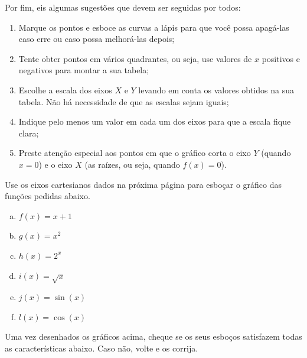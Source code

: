 \documentclass[main_estudante.tex]{subfiles}
\begin{document}
Por fim, eis algumas sugestões que devem ser seguidas por todos:

\begin{enumerate}
 \item Marque os pontos e esboce as curvas a lápis para que você possa apagá-las caso erre ou caso possa melhorá-las depois;
 \item Tente obter pontos em vários quadrantes, ou seja, use valores de $x$ positivos e negativos para montar a sua tabela;
 \item Escolhe a escala dos eixos $X$ e $Y$ levando em conta os valores obtidos na sua tabela. Não há necessidade de que as escalas sejam iguais;
 \item Indique pelo menos um valor em cada um dos eixos para que a escala fique clara;
 \item Preste atenção especial aos pontos em que o gráfico corta o eixo $Y$ (quando $x=0$) e o eixo $X$ (as raízes, ou seja, quando $f(x)=0$).
\end{enumerate}

\newpage

\begin{questao}
Use os eixos cartesianos dados na próxima página para  esboçar o gráfico das funções pedidas abaixo.
\begin{enumerate}[a)]
\item $f(x)=x+1$
\item $g(x)=x^2$
\item $h(x)=2^x$
\item $i(x)=\sqrt{x}$
\item $j(x)=\sin(x)$
\item $l(x)=\cos(x)$
\end{enumerate}
\end{questao}

Uma vez desenhados os gráficos acima, cheque se os seus esboços satisfazem todas as características abaixo. Caso não, volte e os corrija.
\end{document}
